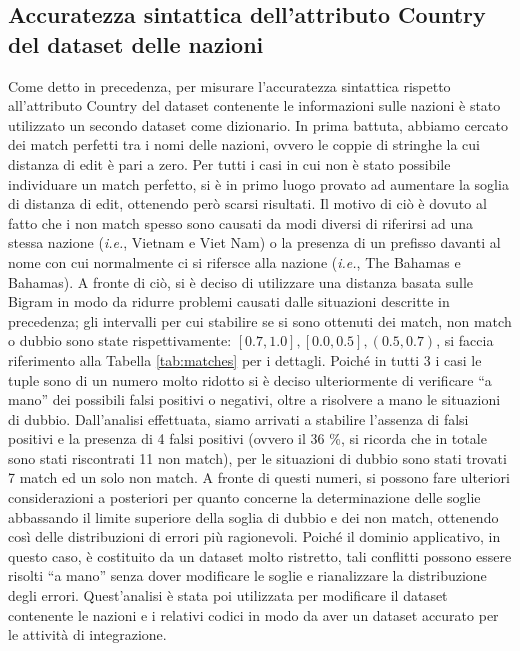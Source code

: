 \subsection{Accuratezza sintattica dell'attributo Country del dataset delle nazioni}
Come detto in precedenza, per misurare l'accuratezza sintattica rispetto all'attributo Country del dataset contenente le informazioni sulle nazioni è stato utilizzato un secondo dataset come dizionario.
In prima battuta, abbiamo cercato dei match perfetti tra i nomi delle nazioni, ovvero le coppie di stringhe la cui distanza di edit è pari a zero.
Per tutti i casi in cui non è stato possibile individuare un match perfetto, si è in primo luogo provato ad aumentare la soglia di distanza di edit, ottenendo però scarsi risultati.
Il motivo di ciò è dovuto al fatto che i non match spesso sono causati da modi diversi di riferirsi ad una stessa nazione (\textit{i.e.}, Vietnam e Viet Nam) o la presenza di un prefisso davanti al nome con cui normalmente ci si rifersce alla nazione (\textit{i.e.}, The Bahamas e Bahamas).
A fronte di ciò, si è deciso di utilizzare una distanza basata sulle Bigram in modo da ridurre problemi causati dalle situazioni descritte in precedenza; gli intervalli per cui stabilire se si sono ottenuti dei match, non match o dubbio sono state rispettivamente: $[0.7, 1.0], [0.0,0.5], (0.5, 0.7)$, si faccia riferimento alla Tabella \ref{tab:matches} per i dettagli.
Poiché in tutti 3 i casi le tuple sono di un numero molto ridotto si è deciso ulteriormente di verificare “a mano” dei possibili falsi positivi o negativi, oltre a risolvere a mano le situazioni di dubbio.
Dall'analisi effettuata, siamo arrivati a stabilire l'assenza di falsi positivi e la presenza di 4 falsi positivi (ovvero il 36 \%, si ricorda che in totale sono stati riscontrati 11 non match), per le situazioni di dubbio sono stati trovati 7 match ed un solo non match.
A fronte di questi numeri, si possono fare ulteriori considerazioni a posteriori per quanto concerne la determinazione delle soglie abbassando il limite superiore della soglia di dubbio e dei non match, ottenendo così delle distribuzioni di errori più ragionevoli. 
Poiché il dominio applicativo, in questo caso, è costituito da un dataset molto ristretto, tali conflitti possono essere risolti “a mano” senza dover modificare le soglie e rianalizzare la distribuzione degli errori. 
Quest'analisi è stata poi utilizzata per modificare il dataset contenente le nazioni e i relativi codici in modo da aver un dataset accurato per le attività di integrazione.\\
